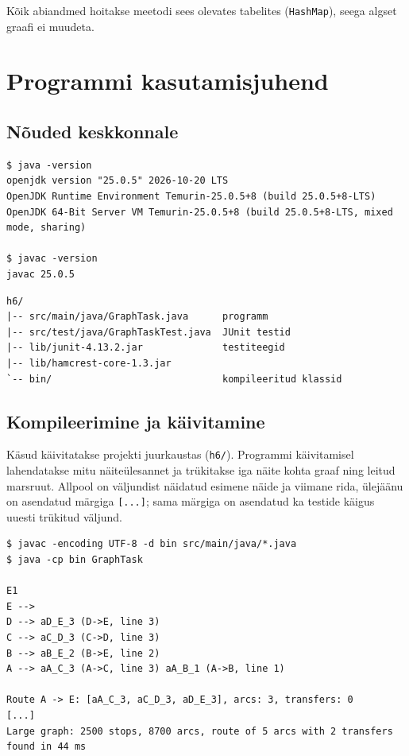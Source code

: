 \documentclass[12pt,a4paper,oneside]{report}
\newcommand{\code}[1]{\texttt{#1}}
\theoremstyle{definition}
\theoremstyle{plain}
\begin{document}
Kõik abiandmed hoitakse meetodi sees olevates tabelites
(\code{HashMap}), seega algset graafi ei muudeta.

\chapter{Programmi kasutamisjuhend}
\label{ch:juhend}

\section{Nõuded keskkonnale}

\begin{lstlisting}[language={},numbers=none,caption={Kasutatud tööriistade versioonid}]
$ java -version
openjdk version "25.0.5" 2026-10-20 LTS
OpenJDK Runtime Environment Temurin-25.0.5+8 (build 25.0.5+8-LTS)
OpenJDK 64-Bit Server VM Temurin-25.0.5+8 (build 25.0.5+8-LTS, mixed mode, sharing)

$ javac -version
javac 25.0.5
\end{lstlisting}

\begin{lstlisting}[language={},numbers=none,caption={Projekti struktuur}]
h6/
|-- src/main/java/GraphTask.java      programm
|-- src/test/java/GraphTaskTest.java  JUnit testid
|-- lib/junit-4.13.2.jar              testiteegid
|-- lib/hamcrest-core-1.3.jar
`-- bin/                              kompileeritud klassid
\end{lstlisting}

\section{Kompileerimine ja käivitamine}

Käsud käivitatakse projekti juurkaustas (\code{h6/}). Programmi käivitamisel lahendatakse
mitu näiteülesannet ja trükitakse iga näite kohta graaf ning leitud
marsruut. Allpool on väljundist näidatud esimene
näide ja viimane rida, ülejäänu on asendatud märgiga \code{[...]}; sama
märgiga on asendatud ka testide käigus uuesti trükitud väljund.

\begin{lstlisting}[language={},numbers=none,caption={Programmi kompileerimine ja käivitamine}]
$ javac -encoding UTF-8 -d bin src/main/java/*.java
$ java -cp bin GraphTask

E1
E -->
D --> aD_E_3 (D->E, line 3)
C --> aC_D_3 (C->D, line 3)
B --> aB_E_2 (B->E, line 2)
A --> aA_C_3 (A->C, line 3) aA_B_1 (A->B, line 1)

Route A -> E: [aA_C_3, aC_D_3, aD_E_3], arcs: 3, transfers: 0
[...]
Large graph: 2500 stops, 8700 arcs, route of 5 arcs with 2 transfers found in 44 ms
\end{lstlisting}
\end{document}
